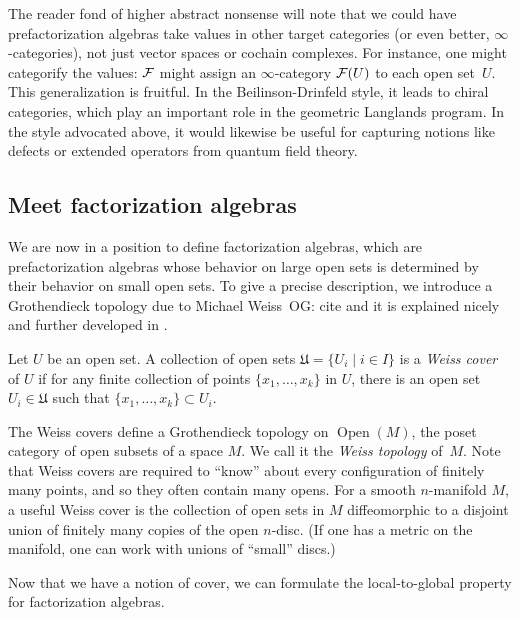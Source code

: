 \documentclass[11pt]{amsart}
\def\Open{\operatorname{Open}}
\def\owen#1{{\textcolor{violet!50!black}{OG: {#1}}}}
\begin{document}
\begin{rmk}
The reader fond of higher abstract nonsense will note that we could have prefactorization algebras take values in other target categories (or even better, $\infty$-categories),
not just vector spaces or cochain complexes.
For instance, one might categorify the values: 
$\mathcal F$ might assign an $\infty$-category $\mathcal F(U)$ to each open set~$U$.
This generalization is fruitful.
In the Beilinson-Drinfeld style, it leads to chiral categories, which play an important role in the geometric Langlands program.
In the style advocated above, it would likewise be useful for capturing notions like defects or extended operators from quantum field theory.
\end{rmk}

\subsection{Meet factorization algebras}

We are now in a position to define factorization algebras,
which are prefactorization algebras whose behavior on large open sets is determined by their behavior on small open sets.
To give a precise description, we introduce a Grothendieck topology due to Michael Weiss~\owen{cite  \cite{Weiss} and it is explained nicely and further developed in \cite{BoavidaWeiss}}.

\begin{dfn}
Let $U$ be an open set. A collection of open sets $\mathfrak{U} = \{ U_i \mid i \in I\}$ is a {\em Weiss cover} of $U$ if for any finite collection of points $\{x_1,\ldots,x_k\}$ in $U$, there is an open set $U_i \in \mathfrak{U}$ such that $\{x_1,\ldots,x_k\} \subset U_i$.
\end{dfn}

The Weiss covers define a Grothendieck topology on $\Open(M)$, the poset category of open subsets of a space $M$. 
We call it the {\em Weiss topology} of~$M$. 
Note that Weiss covers are required to ``know'' about every configuration of finitely many points,
and so they often contain many opens.
For a smooth $n$-manifold $M$, a useful Weiss cover is the collection of open sets in $M$ diffeomorphic to a disjoint union of finitely many copies of the open $n$-disc.
(If one has a metric on the manifold, one can work with unions of ``small'' discs.)

Now that we have a notion of cover, we can formulate the local-to-global property for factorization algebras.
\end{document}
